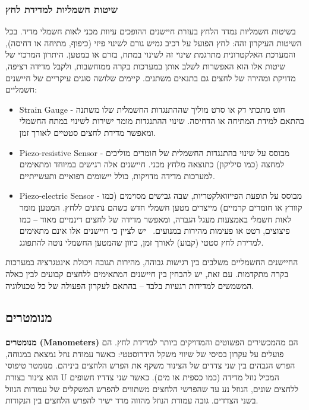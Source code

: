 \documentclass[
  hebrew,
  letterpaper,
  DIV=11,
  numbers=noendperiod]{scrreprt}
\begin{document}
\subsubsection{\texorpdfstring{{שיטות חשמליות למדידת
לחץ}}{שיטות חשמליות למדידת לחץ}}\label{ux5e9ux5d9ux5d8ux5d5ux5ea-ux5d7ux5e9ux5deux5dcux5d9ux5d5ux5ea-ux5dcux5deux5d3ux5d9ux5d3ux5ea-ux5dcux5d7ux5e5}

{בשיטות חשמליות נמדד הלחץ בעזרת חיישנים ההופכים עיוות מכני לאות חשמלי
מדיד}. {בכל השיטות העיקרון זהה: לחץ הפועל על רכיב גמיש גורם לשינוי פיזי
(כיפוף, מתיחה או דחיסה), והמערכת האלקטרונית מתרגמת שינוי זה לשינוי במתח,
בזרם או במטען}. {היתרון המרכזי של שיטות אלו הוא האפשרות לשלב אותן
במערכות בקרה ממוחשבות, ולקבל מדידה רציפה, מדויקת ומהירה של לחצים גם
בתנאים משתנים}. {קיימים שלושה סוגים עיקריים של חיישנים חשמליים}:

\begin{itemize}
\item
  {}Strain Gauge {- חוט מתכתי דק או סרט מוליך שההתנגדות החשמלית שלו
  משתנה בהתאם למידת המתיחה או הדחיסה. שינוי ההתנגדות מומר ישירות לשינוי
  במתח החשמלי ומאפשר מדידת לחצים סטטיים לאורך זמן}.
\item
  Piezo-resistive Sensor {- מבוסס על שינוי בהתנגדות החשמלית של חומרים
  מוליכים למחצה (כמו סיליקון) כתוצאה מלחץ מכני. חיישנים אלה רגישים
  במיוחד ומתאימים למערכות מדידה מדויקות, כולל יישומים רפואיים
  ותעשייתיים}.
\item
  Piezo-electric Sensor {-} {מבוסס על תופעת הפייזואלקטריות, שבה גבישים
  מסוימים (כמו קוורץ או חומרים קרמיים) מייצרים מטען חשמלי חדש כשהם
  נתונים ללחץ. המטען מומר לאות חשמלי באמצעות מעגל הגברה, ומאפשר מדידה של
  לחצים דינמיים מאוד -- כמו פיצוצים, רטט או פעימות מהירות במנועים}.
  {}~{יש לציין כי חיישנים אלו אינם מתאימים למדידת לחץ סטטי (קבוע) לאורך
  זמן, כיוון שהמטען החשמלי נוטה להתפוגג.}
\end{itemize}

{החיישנים החשמליים משלבים בין רגישות גבוהה}, {מהירות תגובה ויכולת
אינטגרציה במערכות בקרה מתקדמות}. {עם זאת, יש להבחין בין חיישנים המתאימים
ללחצים קבועים לבין כאלה המשמשים למדידות רגעיות בלבד -- בהתאם לעקרון
הפעולה של כל טכנולוגיה}.

\subsection{\texorpdfstring{{מנומטרים}}{מנומטרים}}\label{ux5deux5e0ux5d5ux5deux5d8ux5e8ux5d9ux5dd}

\textbf{{מנומטרים} (Manometers)} {הם מהמכשירים הפשוטים והמדויקים ביותר
למדידת לחץ}. {הם פועלים על עקרון בסיסי של שיווי משקל הידרוסטטי: כאשר
עמודת נוזל נמצאת במנוחה, הפרש הגבהים בין שני צדדים של הצינור משקף את
הפרש הלחצים ביניהם}. {מנומטר טיפוסי הוא צינור בצורת} U {המכיל נוזל מדידה
(כמו כספית או מים). כאשר שני צדדיו חשופים ללחצים שונים, הנוזל נע עד
שהפרשי הלחצים משתווים להפרש המשקלים של עמודות הנוזל בשני הצדדים. גובה
עמודת הנוזל מהווה מדד ישיר להפרש הלחצים בין הנקודות}.
\end{document}
